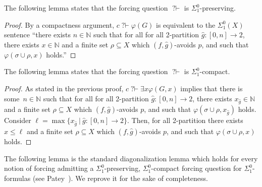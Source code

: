 \documentclass{article}
\newcommand{\qvdash}{\operatorname{{?}{\vdash}}}
\newcommand{\NN}[0]{\mathbb{N}}
\def\qt#1{``#1''}%
\def\NN{\mathbb{N}}
\def\qt#1{``#1''}%
\numberwithin{theorem}{section}
\newtheorem{lemma}[theorem]{Lemma}
\theoremstyle{definition}
\begin{document}
The following lemma states that the forcing question $\qvdash$ is $\Sigma_1^0$-preserving.

\begin{proof}
    By a compactness argument, $c \qvdash \varphi(G)$ is equivalent to the $\Sigma^0_1(X)$ sentence \qt{there exists $n \in \NN$ such that for all for all 2-partition $\hat g : [0, n] \to 2$, there exists $x \in \NN$ and a finite set $\rho \subseteq X$ which $(f,\hat g)$-avoids $p$, and such that $\varphi(\sigma \cup \rho,x)$ holds.}
\end{proof}

The following lemma states that the forcing question $\qvdash$ is $\Sigma_1^0$-compact.


\begin{proof}
    As stated in the previous proof, $c \qvdash \exists x \varphi(G,x)$ implies that there is some~$n \in \NN$ such that for all for all 2-partition $\hat g : [0, n] \to 2$, there exists $x_{\hat g} \in \NN$ and a finite set $\rho \subseteq X$ which $(f,\hat g)$-avoids $p$, and such that $\varphi(\sigma \cup \rho,x_{\hat g})$ holds. Consider $\ell = \max \{ x_{\hat g}\ |\ \hat g : [0,n] \to 2 \}$. Then, for all 2-partition there exists $x \leq \ell$ and a finite set $\rho \subseteq X$ which $(f,\hat g)$-avoids $p$, and such that $\varphi(\sigma \cup \rho,x)$ holds.

\end{proof}

The following lemma is the standard diagonalization lemma which holds for every notion of forcing admitting a $\Sigma^0_1$-preserving, $\Sigma^0_1$-compact forcing question for $\Sigma^0_1$-formulas (see Patey~\cite[Chapter 3]{pateylowness}). We reprove it for the sake of completeness.


\end{document}
